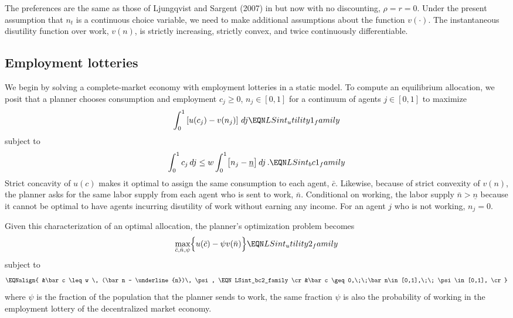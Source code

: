 The preferences are the same as those of Ljungqvist and Sargent (2007)
in  but now with no discounting, $\rho = r = 0$.
Under the present assumption that $n_t$ is a continuous
choice variable, we need to make additional assumptions about the
function $v(\cdot)$. The instantaneous disutility function over
work, $v(n)$, is strictly increasing, strictly convex, and
twice continuously differentiable.


\subsection{Employment lotteries}\label{sec:LS_Prescott}%
We begin by solving a complete-market economy with employment
lotteries in a static model. To compute an equilibrium allocation, we posit that a planner chooses
 consumption and employment $c_{j}\geq 0$,
$n_{j}\in [0,1]$ for a continuum of agents $j\in[0,1]$ to maximize
$$
\int_0^1 \left[ u(c_{j}) - v(n_{j}) \right]\,dj
                                         \EQN LSint_utility1_family
$$
subject to
$$
\int_0^1 c_{j} \, dj \leq w \int_0^1 \bigl[ n_j - \underline{n} \bigr]\,dj \,.
\EQN LSint_bc1_family
$$
Strict concavity of $u(c)$ makes it optimal to assign
the same consumption to each agent, $\bar c$. Likewise, because of
strict convexity of $v(n)$, the planner asks for the same labor
supply from each agent who is sent to work, $\bar n$. Conditional on
working, the labor supply $\bar n > \underline{n}$ because
it cannot be optimal to have agents incurring disutility of work
without earning any income. For an agent $j$ who is not working,
$n_j=0$.

Given this characterization of an optimal allocation, the planner's
optimization problem becomes
$$
\max_{\bar c, \bar n, \psi} \Bigl\{ u(\bar c) - \psi v(\bar n) \Bigr\}
                                         \EQN LSint_utility2_family
$$
subject to
$$\EQNalign{
&\bar c \leq w \, (\bar n - \underline{n})\, \psi,
                                             \EQN LSint_bc2_family   \cr
&\bar c \geq 0,\;\;\bar n\in [0,1],\;\;  \psi\in[0,1],               \cr}
$$
where $\psi $ is the fraction of the population that the planner
sends to work,  the same fraction $\psi$ is also the  probability of working in the employment
lottery of the decentralized market economy.

